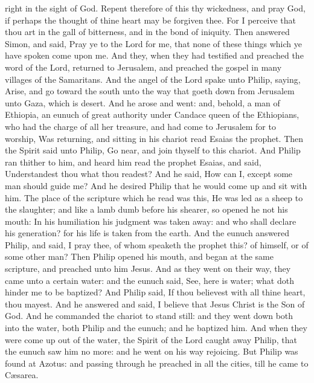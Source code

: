 right in the sight of God.  Repent therefore of this thy
wickedness, and pray God, if perhaps the thought of thine heart may be
forgiven thee.  For I perceive that thou art in the gall of
bitterness, and in the bond of iniquity.  Then answered
Simon, and said, Pray ye to the Lord for me, that none of these things
which ye have spoken come upon me.  And they, when they had
testified and preached the word of the Lord, returned to Jerusalem, and
preached the gospel in many villages of the Samaritans. 
And the angel of the Lord spake unto Philip, saying, Arise, and go
toward the south unto the way that goeth down from Jerusalem unto Gaza,
which is desert.  And he arose and went: and, behold, a man
of Ethiopia, an eunuch of great authority under Candace queen of the
Ethiopians, who had the charge of all her treasure, and had come to
Jerusalem for to worship,  Was returning, and sitting in
his chariot read Esaias the prophet.  Then the Spirit said
unto Philip, Go near, and join thyself to this chariot. 
And Philip ran thither to him, and heard him read the prophet Esaias,
and said, Understandest thou what thou readest?  And he
said, How can I, except some man should guide me? And he desired Philip
that he would come up and sit with him.  The place of the
scripture which he read was this, He was led as a sheep to the
slaughter; and like a lamb dumb before his shearer, so opened he not his
mouth:  In his humiliation his judgment was taken away: and
who shall declare his generation? for his life is taken from the earth.
 And the eunuch answered Philip, and said, I pray thee, of
whom speaketh the prophet this? of himself, or of some other man?
 Then Philip opened his mouth, and began at the same
scripture, and preached unto him Jesus.  And as they went
on their way, they came unto a certain water: and the eunuch said, See,
here is water; what doth hinder me to be baptized?  And
Philip said, If thou believest with all thine heart, thou mayest. And he
answered and said, I believe that Jesus Christ is the Son of God.
 And he commanded the chariot to stand still: and they went
down both into the water, both Philip and the eunuch; and he baptized
him.  And when they were come up out of the water, the
Spirit of the Lord caught away Philip, that the eunuch saw him no more:
and he went on his way rejoicing.  But Philip was found at
Azotus: and passing through he preached in all the cities, till he came
to Cæsarea.

